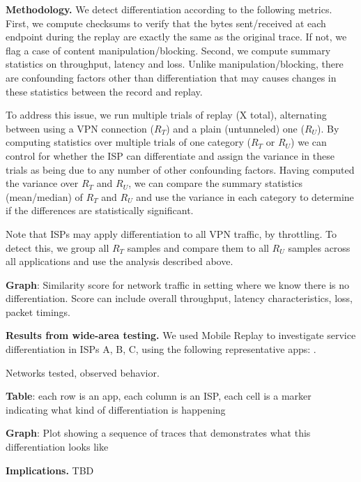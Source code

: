 \noindent\textbf{Methodology.} We detect differentiation according to the following metrics. First, we 
compute checksums to verify that the bytes sent/received at each endpoint during the replay are 
exactly the same as the original trace. If not, we flag a case of content manipulation/blocking. Second, we
compute summary statistics on throughput, latency and loss. Unlike manipulation/blocking, there are 
confounding factors other than differentiation that may causes changes in these statistics between the 
record and replay.

To address this issue, we run multiple trials of replay (X total), alternating between using a VPN connection ($R_T$) and 
a plain (untunneled) one ($R_U$). By computing statistics over multiple trials of one category ($R_T$ or $R_U$) we 
can control for whether the ISP can differentiate and assign the variance in these trials as being due to 
any number of other confounding factors. Having computed the variance over $R_T$ and $R_U$, we can 
compare the summary statistics (mean/median) of $R_T$ and $R_U$ and use the variance in each category 
to determine if the differences are statistically significant.

Note that ISPs may apply differentiation to all VPN traffic, \eg by throttling. To detect this, we group all $R_T$ 
samples and compare them to all $R_U$ samples across all applications and use the analysis described above. 

\textbf{Graph}: Similarity score for network traffic in setting where we know there is no differentiation. 
Score can include overall throughput, latency characteristics, loss, packet timings.

\noindent\textbf{Results from wide-area testing.} We used Mobile Replay to investigate service differentiation in 
ISPs A, B, C,  using the following representative apps: . 
 
Networks tested, observed behavior.

\textbf{Table}: each row is an app, each column is an ISP, each cell is a marker indicating what kind of 
differentiation is happening

\textbf{Graph}: Plot showing a sequence of traces that demonstrates what this differentiation looks like


\noindent\textbf{Implications.}  TBD 
